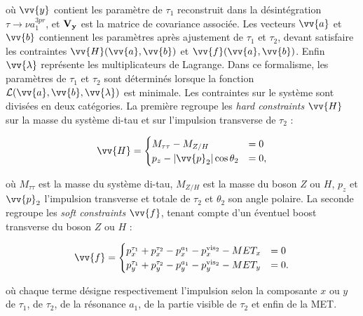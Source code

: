 où $\vv{y}$ contient les paramètre de $\tau_1$ reconstruit dans la désintégration $\tau\to\nu a_1^{3pr}$, et $\vb{V_y}$ est la matrice de covariance associée. Les vecteurs $\vv{a}$ et $\vv{b}$ contiennent les paramètres après ajustement de $\tau_1$ et $\tau_2$, devant satisfaire les contraintes $\vv{H}(\vv{a},\vv{b})$ et $\vv{f}(\vv{a},\vv{b})$. Enfin $\vv{\lambda}$ représente les multiplicateurs de Lagrange. Dans ce formalisme, les paramètres de $\tau_1$ et $\tau_2$ sont déterminés lorsque la fonction $\mathcal{L}(\vv{a},\vv{b},\vv{\lambda})$ est minimale. Les contraintes sur le système sont divisées en deux catégories. La première regroupe les \textit{hard constraints} $\vv{H}$ sur la masse du système di-tau et sur l'impulsion transverse de $\tau_2$ :

\begin{equation} 
    \vv{H}=
    \begin{cases} 
    M_{\tau\tau} - M_{Z/H} & = 0 \\ 
    p_{z} - |\vv{p}_{2}|\cos\theta_2 & = 0, 
    \end{cases} 
\end{equation}

où $M_{\tau\tau}$ est la masse du système di-tau, $M_{Z/H}$ est la masse du boson $Z$ ou $H$, $p_z$ et $\vv{p}_2$ l'impulsion transverse et totale de $\tau_2$ et $\theta_2$ son angle polaire. La seconde regroupe les \textit{soft constraints} $\vv{f}$, tenant compte d'un éventuel boost transverse du boson $Z$ ou $H$ :

\begin{equation} 
    \vv{f}=
    \begin{cases} 
    p_x^{\tau_1}+p_x^{\tau_2}-p_x^{a_1}-p_x^{\text{vis}_2}-MET_x & = 0 \\ 
    p_y^{\tau_1}+p_y^{\tau_2}-p_y^{a_1}-p_y^{\text{vis}_2}-MET_y & = 0.
    \end{cases} 
\end{equation}

où chaque terme désigne respectivement l'impulsion selon la composante $x$ ou $y$ de $\tau_1$, de $\tau_2$, de la résonance $a_1$, de la partie visible de $\tau_2$ et enfin de la MET. \\

